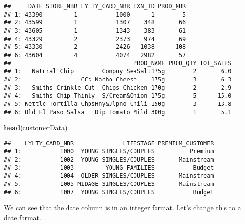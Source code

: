 \documentclass[]{article}
\newenvironment{Shaded}{\begin{snugshade}}{\end{snugshade}}
\newcommand{\CommentTok}[1]{\textcolor[rgb]{0.56,0.35,0.01}{\textit{#1}}}
\newcommand{\DataTypeTok}[1]{\textcolor[rgb]{0.13,0.29,0.53}{#1}}
\newcommand{\KeywordTok}[1]{\textcolor[rgb]{0.13,0.29,0.53}{\textbf{#1}}}
\newcommand{\NormalTok}[1]{#1}
\newcommand{\OperatorTok}[1]{\textcolor[rgb]{0.81,0.36,0.00}{\textbf{#1}}}
\newcommand{\StringTok}[1]{\textcolor[rgb]{0.31,0.60,0.02}{#1}}
\begin{document}
\begin{verbatim}
##     DATE STORE_NBR LYLTY_CARD_NBR TXN_ID PROD_NBR
## 1: 43390         1           1000      1        5
## 2: 43599         1           1307    348       66
## 3: 43605         1           1343    383       61
## 4: 43329         2           2373    974       69
## 5: 43330         2           2426   1038      108
## 6: 43604         4           4074   2982       57
##                                   PROD_NAME PROD_QTY TOT_SALES
## 1:   Natural Chip        Compny SeaSalt175g        2       6.0
## 2:                 CCs Nacho Cheese    175g        3       6.3
## 3:   Smiths Crinkle Cut  Chips Chicken 170g        2       2.9
## 4:   Smiths Chip Thinly  S/Cream&Onion 175g        5      15.0
## 5: Kettle Tortilla ChpsHny&Jlpno Chili 150g        3      13.8
## 6: Old El Paso Salsa   Dip Tomato Mild 300g        1       5.1
\end{verbatim}

\begin{Shaded}
\begin{Highlighting}[]
\KeywordTok{head}\NormalTok{(customerData)}
\end{Highlighting}
\end{Shaded}

\begin{verbatim}
##    LYLTY_CARD_NBR              LIFESTAGE PREMIUM_CUSTOMER
## 1:           1000  YOUNG SINGLES/COUPLES          Premium
## 2:           1002  YOUNG SINGLES/COUPLES       Mainstream
## 3:           1003         YOUNG FAMILIES           Budget
## 4:           1004  OLDER SINGLES/COUPLES       Mainstream
## 5:           1005 MIDAGE SINGLES/COUPLES       Mainstream
## 6:           1007  YOUNG SINGLES/COUPLES           Budget
\end{verbatim}

We can see that the date column is in an integer format. Let's change
this to a date format.

\begin{Shaded}
\end{Shaded}
\end{document}
